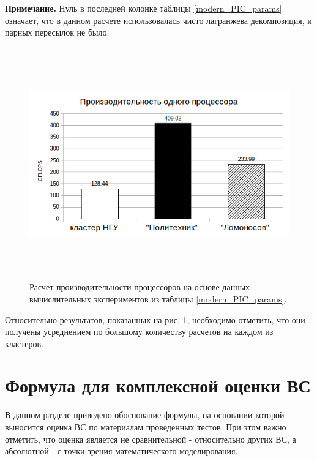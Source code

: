 \textbf{Примечание.} Нуль в последней колонке таблицы \ref{modern_PIC_params} означает, что в данном расчете использовалась чисто лагранжева декомпозиция, и парных пересылок не было.
	
	
\begin{figure}[htb]
	\begin{center}
		\includegraphics[height=10cm,keepaspectratio]{images/modern_PIC_params_FLOPS_new.png}
	\end{center}
	\caption{Расчет производительности процессоров на основе данных вычислительных экспериментов из таблицы \ref{modern_PIC_params}. }
	\label{xi_flops}
\end{figure} 
Относительно результатов, показанных на рис. \ref{xi_flops}, необходимо отметить, что они получены усреднением по большому количеству расчетов на каждом из кластеров. 


\clearpage








\section{Формула для комплексной оценки ВС}
\label{complex_evaluation}
В данном разделе приведено обоснование формулы, на основании которой выносится оценка ВС по материалам проведенных тестов. При этом важно отметить, что оценка является не сравнительной - относительно других ВС, а абсолютной - с точки зрения математического моделирования. 

